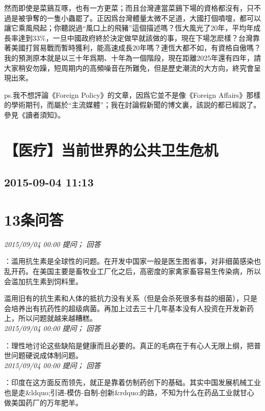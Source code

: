 \documentclass[twocolumn]{ctexart}
\begin{document}
然而即使是菜鷄互啄，也有一方更菜；而且台灣連當菜鷄下場的資格都沒有，只不過是被爭奪的一隻小蟲罷了。正因爲台灣體量太微不足道，大國打個噴嚏，都可以讓它乘風飛起；你聽説過“風口上的飛豬”這個描述嗎？恆大風光了20年，平均年成長率達到33\%，一旦中國政府終於決定做早就該做的事，現在下場怎麽樣？台灣靠著美國打貿易戰而暫時獲利，能高速成長20年嗎？連恆大都不如，有資格自傲嗎？我的預測原本就是以三十年爲期、十年為一個階段，現在距離2025年還有四年，請大家稍安勿躁，短周期内的高頻噪音在所難免，但是歷史潮流的大方向，終究會呈現出來。

ps.我不想評論《Foreign Policy》的文章，因爲它並不是像《Foreign Affairs》那樣的學術期刊，而屬於“主流媒體”；我在討論假新聞的博文裏，該説的都已經説了。參見《讀者須知》。
\\


\section{【医疗】当前世界的公共卫生危机}
\subsection{2015-09-04 11:13}


\section{13条问答}

\textit{\hfill\noindent\small 2015/09/04 00:00 提问； 回答}

：滥用抗生素是全球性的问题。在开发中国家一般是医生图省事，对非细菌感染也乱开药。在美国主要是畜牧业工厂化之后，高密度的家禽家畜容易生传染病，所以会滥加抗生素到饲料里。

滥用旧有的抗生素和人体的抵抗力没有关系（但是会杀死很多有益的细菌），只是会培养出有抗药性的超级病菌。再加上过去三十几年基本没有人投资在开发新药上，所以问题就越来越糟糕。\\

\textit{\hfill\noindent\small 2015/09/04 00:00 提问； 回答}

：理性地讨论这些缺陷是健康而且必要的。真正的毛病在于有心人无限上纲，把普世问题硬说成体制问题。\\

\textit{\hfill\noindent\small 2015/09/04 00:00 提问； 回答}

：印度在这方面反而领先，就正是靠着仿制药创下的基础。其实中国发展机械工业也是走\&ldquo;引进-模仿-自制-创新\&rdquo;的路，不知为什么在药品工业就甘心做美国药厂的万年肥羊。\\
\end{document}
